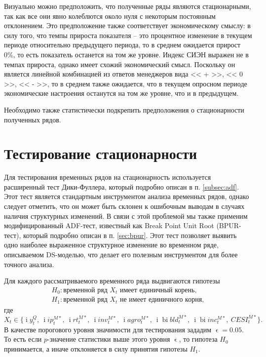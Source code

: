 \documentclass[a4paper, 14pt]{extreport}
\numberwithin{equation}{section}
\renewcommand{\epsilon}{\upvarepsilon}
\renewcommand{\i}{\operatorname{i}}
\newcommand{\bi}{\operatorname{bi}}
\numberwithin{equation}{section}
\begin{document}
	Визуально можно предположить, что полученные ряды являются стационарными, так как все они явно колеблются около нуля с некоторым постоянным отклонением. Это предположение также соответствует экономическому смыслу: в силу того, что темпы прироста показателя -- это процентное изменение в текущем периоде относительно предыдущего периода, то в среднем ожидается прирост 0\%, то есть показатель останется на том же уровне. Индекс СИЭН выражен не в темпах прироста, однако имеет схожий экономический смысл. Поскольку он является линейной комбинацией из ответов менеджеров вида << + >>, << 0 >>, << - >>, то в среднем также ожидается, что в текущем опросном периоде экономические настроения останутся на том же уровне, что и в предыдущем.
	
	Необходимо также статистически подкрепить предположения о стационарности полученных рядов. 
	
	\section{Тестирование стационарности}
	Для тестирования временных рядов на стационарность используется расширенный тест Дики-Фуллера, который подробно описан в п. \ref{subsec:adf}.
	Этот тест является стандартным инструментом анализа временных рядов, однако следует отметить, что он может быть склонен к ошибочным выводам в случаях наличия структурных изменений.
	В связи с этой проблемой мы также применим модифицированный ADF-тест, известный как Break Point Unit Root (BPUR-тест), который подробно описан в п. \ref{sec:bpur}. Этот тест позволяет выявить одно наиболее выраженное структурное изменение во временном ряде, описываемом DS-моделью, что делает его полезным инструментом для более точного анализа.
	
	Для каждого рассматриваемого временного ряда выдвигаются гипотезы
	\begin{equation*}
		\begin{gathered}
			H_0 : \text{временной ряд } X_t \text{ имеет единичный корень},\\
			H_1 : \text{временной ряд } X_t \text{ не имеет единичного корня},
		\end{gathered}
	\end{equation*}
	где $$X_t \in \{\i y_t^Q,\ \i ip_t^{M*},\ \i rt_t^{M*},\ \i inv_t^{M*},\ \i agro_t^{M*},\ \i \bi bld_t^{M*},\ \i \bi inc_t^{M*},\ CESI_t^{M*}\}.$$
	В качестве порогового уровня значимости для тестирования зададим $\epsilon = 0.05$. То есть если $p$-значение статистики выше этого уровня $\epsilon$, то гипотеза $H_0$ принимается, а иначе отклоняется в силу принятия гипотезы $H_1$.
	
\end{document}
